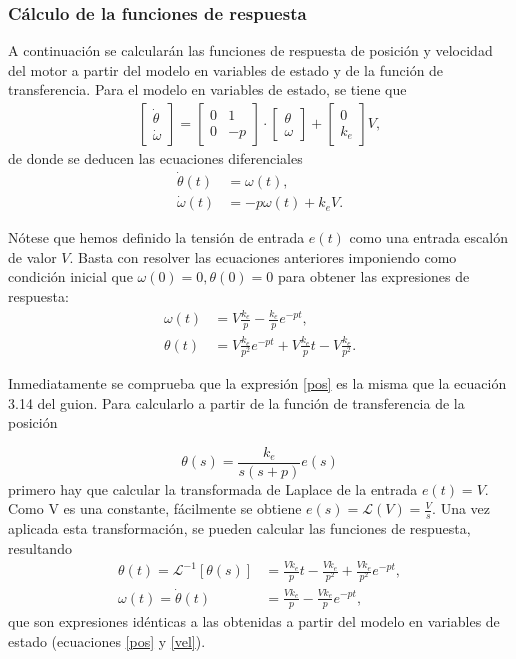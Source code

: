 \documentclass[a4paper, 12pt]{article}
\begin{document}
\subsubsection{Cálculo de la funciones de respuesta}

A continuación se calcularán las funciones de respuesta de posición y velocidad del motor a partir del modelo en variables de estado y de la función de transferencia. 
Para el modelo en variables de estado, se tiene que 
\begin{align}
	\begin{bmatrix} \dot\theta \\ \dot\omega \end{bmatrix}  =  \begin{bmatrix} 0 & 1 \\ 0 & -p \end{bmatrix} \cdot \begin{bmatrix} \theta \\ \omega  \end{bmatrix} + \begin{bmatrix} 0 \\ k_e \end{bmatrix} V,
\end{align}
de donde se deducen las ecuaciones diferenciales 
\begin{align}
	\dot\theta(t) &= \omega(t) , \label{posdot} \\
	\dot\omega(t) &= -p \omega(t) + k_e V. \label{veldot}
\end{align}

Nótese que hemos definido la tensión de entrada $e(t)$ como una entrada escalón de valor $V$. Basta con resolver las ecuaciones anteriores imponiendo como condición inicial que $\omega(0) = 0, \theta(0) = 0$ para obtener las expresiones de respuesta:
\begin{align}
	\omega(t) &= V\frac{k_e}{p} - \frac{k_e }{p} e^{-p t},  \label{vel}\\
	\theta(t) &= V\frac{k_e}{p^2}e^{-p t} + V\frac{k_e}{p} t - V\frac{k_e}{p^2}.  \label{pos}
\end{align}

Inmediatamente se comprueba que la expresión \ref{pos} es la misma que la ecuación 3.14 del guion. 
Para calcularlo a partir de la función de transferencia de la posición

\begin{equation}
	\theta(s) = \frac{k_e}{s(s + p)} e(s)
\end{equation}
primero hay que calcular la transformada de Laplace de la entrada $e(t) = V$. Como V es una constante, fácilmente se obtiene $e(s) = \mathcal{L} (V) = \frac{V}{s}$. Una vez aplicada esta transformación, se pueden calcular las funciones de respuesta, resultando
\begin{align}
	\theta(t) = \mathcal{L}^{-1} [\theta(s)] &=  \frac{V  k_e }{p} t - \frac{V k_e}{p^2} + \frac{V k_e}{p^2} e^{-p t}, \\
	\omega(t) = \dot\theta(t) &= \frac{V  k_e}{p} - \frac{V k_e}{p} e^{-p t},
\end{align}
que son expresiones idénticas a las obtenidas a partir del modelo en variables de estado (ecuaciones \ref{pos} y \ref{vel}).
\end{document}
